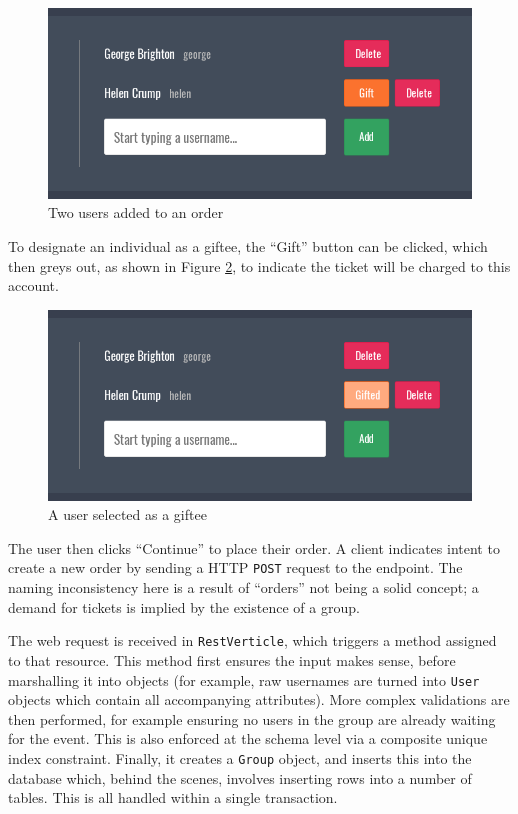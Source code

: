 \documentclass[12pt,a4paper]{bhamdissertation}
\newcommand{\code}[1]{\texttt{#1}}
\begin{document}
\begin{figure}[!htbp]
    \centering
    \includegraphics[width=1\linewidth]{img/order_attendees.png}
    \caption{Two users added to an order}
    \label{img:order_attendees}
\end{figure}

To designate an individual as a giftee, the ``Gift'' button can be clicked, which then greys out, as shown in Figure \ref{img:order_attendees_gifted}, to indicate the ticket will be charged to this account.

\begin{figure}[!htbp]
    \centering
    \includegraphics[width=1\linewidth]{img/order_attendees_gifted.png}
    \caption{A user selected as a giftee}
    \label{img:order_attendees_gifted}
\end{figure}

The user then clicks ``Continue'' to place their order. A client indicates intent to create a new order by sending a HTTP \code{POST} request to the \code{} endpoint. The naming inconsistency here is a result of ``orders'' not being a solid concept; a demand for tickets is implied by the existence of a group.

The web request is received in \code{RestVerticle}, which triggers a method assigned to that resource. This method first ensures the input makes sense, before marshalling it into objects (for example, raw usernames are turned into \code{User} objects which contain all accompanying attributes). More complex validations are then performed, for example ensuring no users in the group are already waiting for the event. This is also enforced at the schema level via a composite unique index constraint. Finally, it creates a \code{Group} object, and inserts this into the database which, behind the scenes, involves inserting rows into a number of tables. This is all handled within a single transaction.
\end{document}
